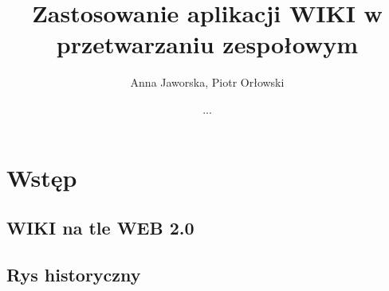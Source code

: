 \documentclass{article}
\title{Zastosowanie aplikacji WIKI w przetwarzaniu zespołowym}
\author{Anna Jaworska, Piotr Orłowski}
\date{...}
\begin{document}
\maketitle
\tableofcontents

\section{Wstęp}



	\subsection {WIKI na tle WEB 2.0}





	\subsection{Rys historyczny}

% 
\end{document}
